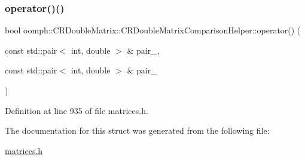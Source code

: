 \subsubsection{\texorpdfstring{operator()()}{operator()()}}
{\footnotesize\ttfamily bool oomph\+::\+C\+R\+Double\+Matrix\+::\+C\+R\+Double\+Matrix\+Comparison\+Helper\+::operator() (\begin{DoxyParamCaption}\item[{const std\+::pair$<$ int, double $>$ \&}]{pair\+\_,  }\item[{const std\+::pair$<$ int, double $>$ \&}]{pair\+\_ }\end{DoxyParamCaption})\hspace{0.3cm}{\ttfamily [inline]}}



Definition at line 935 of file matrices.\+h.



The documentation for this struct was generated from the following file\+:\begin{DoxyCompactItemize}
\item 
\hyperlink{matrices_8h}{matrices.\+h}\end{DoxyCompactItemize}
